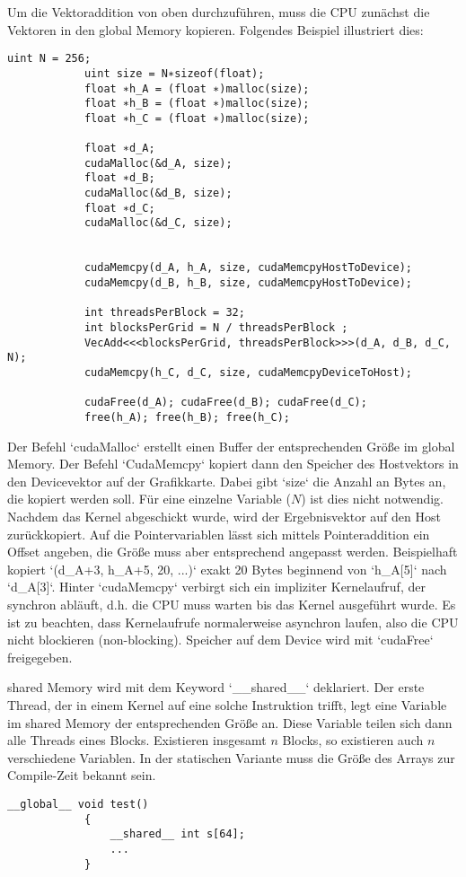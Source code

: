 		\newpage
		
		Um die Vektoraddition von oben durchzuführen, muss die CPU zunächst die Vektoren in den \Gls{global Memory} kopieren. Folgendes Beispiel illustriert dies:		
		\begin{lstlisting}[caption=Vektoraddition Host]
			uint N = 256;
			uint size = N∗sizeof(float);
			float ∗h_A = (float ∗)malloc(size);
			float ∗h_B = (float ∗)malloc(size);
			float ∗h_C = (float ∗)malloc(size);

			float ∗d_A;
			cudaMalloc(&d_A, size);
			float ∗d_B;
			cudaMalloc(&d_B, size);
			float ∗d_C;
			cudaMalloc(&d_C, size);
			
			
			cudaMemcpy(d_A, h_A, size, cudaMemcpyHostToDevice);
			cudaMemcpy(d_B, h_B, size, cudaMemcpyHostToDevice);

			int threadsPerBlock = 32;
			int blocksPerGrid = N / threadsPerBlock ;
			VecAdd<<<blocksPerGrid, threadsPerBlock>>>(d_A, d_B, d_C, N);
			cudaMemcpy(h_C, d_C, size, cudaMemcpyDeviceToHost);
			
			cudaFree(d_A); cudaFree(d_B); cudaFree(d_C);
			free(h_A); free(h_B); free(h_C);
		\end{lstlisting}	
		
		Der Befehl \li`cudaMalloc` erstellt einen Buffer der entsprechenden Größe im \Gls{global Memory}.
		Der Befehl \li`CudaMemcpy` kopiert dann den Speicher des Hostvektors in den Devicevektor auf der Grafikkarte. Dabei gibt \li`size` die Anzahl an Bytes an, die kopiert werden soll. Für eine einzelne Variable ($N$) ist dies nicht notwendig.
		Nachdem das Kernel abgeschickt wurde, wird der Ergebnisvektor auf den Host zurückkopiert. Auf die Pointervariablen lässt sich mittels Pointeraddition ein Offset angeben, die Größe muss aber entsprechend angepasst werden. Beispielhaft kopiert \li`(d_A+3, h_A+5, 20, ...)` exakt 20 Bytes beginnend von \li`h_A[5]` nach \li`d_A[3]`.
		Hinter \li`cudaMemcpy` verbirgt sich ein impliziter \Gls{Kernel}aufruf, der synchron abläuft, d.h. die CPU muss warten bis das \Gls{Kernel} ausgeführt wurde. Es ist zu beachten, dass \Gls{Kernel}aufrufe normalerweise asynchron laufen, also die CPU nicht blockieren (non-blocking). 
		Speicher auf dem Device wird mit \li`cudaFree` freigegeben.
		
		\Gls{shared Memory} wird mit dem Keyword \li`__shared__` deklariert. Der erste \Gls{Thread}, der in einem \Gls{Kernel} auf eine solche Instruktion trifft, legt eine Variable im \gls{shared Memory} der entsprechenden Größe an. Diese Variable teilen sich dann alle \Glspl{Thread} eines \Gls{Block}s. Existieren insgesamt $n$ \Glspl{Block}, so existieren auch $n$ verschiedene Variablen. In der statischen Variante muss die Größe des Arrays zur Compile-Zeit bekannt sein.
		\begin{lstlisting}[caption=shared Memory statisch]
			__global__ void test()
			{
  				__shared__ int s[64];
  				...
			}
  		\end{lstlisting}

